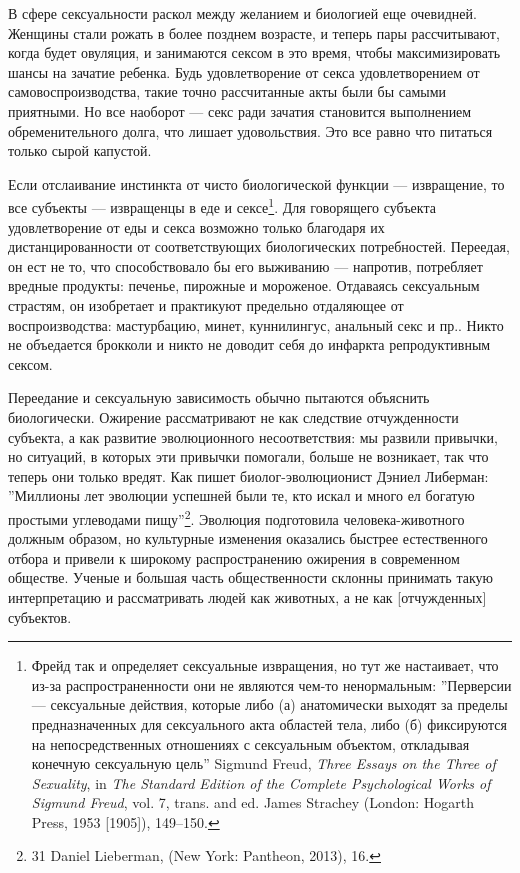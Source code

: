 \documentclass[12pt]{book}
\begin{document}
В сфере сексуальности раскол между желанием и биологией еще очевидней. Женщины стали рожать в более позднем возрасте, и теперь пары рассчитывают, когда будет овуляция, и занимаются сексом в это время, чтобы максимизировать шансы на зачатие ребенка. Будь удовлетворение от секса удовлетворением от самовоспроизводства, такие точно рассчитанные акты были бы самыми приятными. Но все наоборот --- секс ради зачатия становится выполнением обременительного долга, что лишает удовольствия. Это все равно что питаться только сырой капустой.

Если отслаивание инстинкта от чисто биологической функции --- извращение, то все субъекты --- извращенцы в еде и сексе\footnote{Фрейд так и определяет сексуальные извращения, но тут же настаивает, что из-за распространенности они не являются чем-то ненормальным: ''Перверсии --- сексуальные действия, которые либо (а) анатомически выходят за пределы предназначенных для сексуального акта областей тела, либо (б) фиксируются на непосредственных отношениях с сексуальным объектом, откладывая конечную сексуальную цель'' Sigmund Freud, \textit{Three Essays on the Three of Sexuality}, in \textit{The Standard Edition of the Complete Psychological Works of Sigmund Freud}, vol. 7, trans. and ed. James Strachey (London: Hogarth Press, 1953 [1905]), 149–150.}. Для говорящего субъекта удовлетворение от еды и секса возможно только благодаря их дистанцированности от соответствующих биологических потребностей. Переедая, он ест не то, что способствовало бы его выживанию --- напротив, потребляет вредные продукты: печенье, пирожные и мороженое. Отдаваясь сексуальным страстям, он изобретает и практикуют предельно отдаляющее от воспроизводства: мастурбацию, минет, куннилингус, анальный секс и пр.. Никто не объедается брокколи и никто не доводит себя до инфаркта репродуктивным сексом.

Переедание и сексуальную зависимость обычно пытаются объяснить биологически. Ожирение рассматривают не как следствие отчужденности субъекта, а как развитие эволюционного несоответствия: мы развили привычки, но ситуаций, в которых эти привычки помогали, больше не возникает, так что теперь они только вредят. Как пишет биолог-эволюционист Дэниел Либерман: ''Миллионы лет эволюции успешней были те, кто искал и много ел богатую простыми углеводами пищу''\footnote{31 Daniel Lieberman,  (New York: Pantheon, 2013), 16.}. Эволюция подготовила человека-животного должным образом, но культурные изменения оказались быстрее естественного отбора и привели к широкому распространению ожирения в современном обществе. Ученые и большая часть общественности склонны принимать такую интерпретацию и рассматривать людей как животных, а не как [отчужденных] субъектов.
\end{document}
